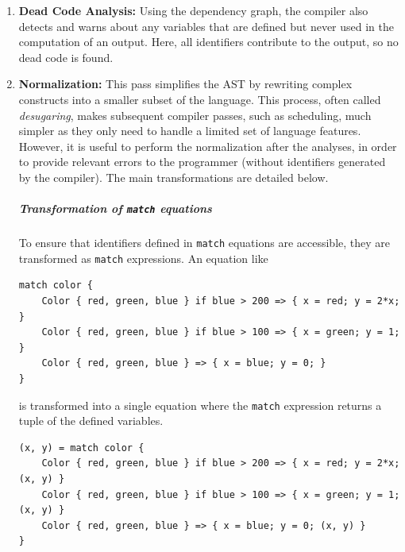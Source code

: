 \begin{enumerate}
    \item \textbf{Dead Code Analysis:} Using the dependency graph, the compiler also detects and
          warns about any variables that are defined but never used in the computation of an output.
          Here, all identifiers contribute to the output, so no dead code is found.

    \item \textbf{Normalization:} This pass simplifies the AST by rewriting complex constructs into
          a smaller subset of the language. This process, often called \emph{desugaring}, makes
          subsequent compiler passes, such as scheduling, much simpler as they only need to handle a
          limited set of language features. However, it is useful to perform the normalization after
          the analyses, in order to provide relevant errors to the \GRust programmer (\eg without
          identifiers generated by the compiler).
          The main transformations are detailed below.

          \subparagraph{Transformation of \texttt{match} equations}
          To ensure that identifiers defined in \texttt{match} equations are accessible, they are
          transformed as \texttt{match} expressions. An equation like
          \begin{lstlisting}[language=GRust]
match color {
    Color { red, green, blue } if blue > 200 => { x = red; y = 2*x; }
    Color { red, green, blue } if blue > 100 => { x = green; y = 1; }
    Color { red, green, blue } => { x = blue; y = 0; }
}
\end{lstlisting}
          is transformed into a single equation where the \texttt{match} expression returns a tuple
          of the defined variables.
          \begin{lstlisting}[language=GRust]
(x, y) = match color {
    Color { red, green, blue } if blue > 200 => { x = red; y = 2*x; (x, y) }
    Color { red, green, blue } if blue > 100 => { x = green; y = 1; (x, y) }
    Color { red, green, blue } => { x = blue; y = 0; (x, y) }
}
\end{lstlisting}


\end{enumerate}
